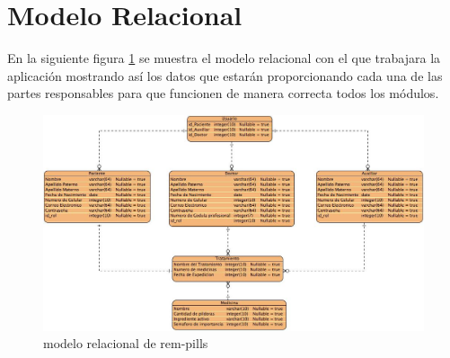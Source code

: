 \begin{itemize}
	
	
\end{itemize}

\section{Modelo Relacional}
En la siguiente figura \ref{fig:modelorelacional} se muestra el modelo relacional con el que trabajara la aplicación mostrando así los datos que estarán proporcionando cada una de las partes responsables para que funcionen de manera correcta todos los módulos.
\begin{figure}[htb]
	\centering
	\includegraphics[width=1.1\textwidth]{images/cap2/modelorelacional}
	\caption{modelo relacional de rem-pills} \label{fig:modelorelacional}
\end{figure} 




